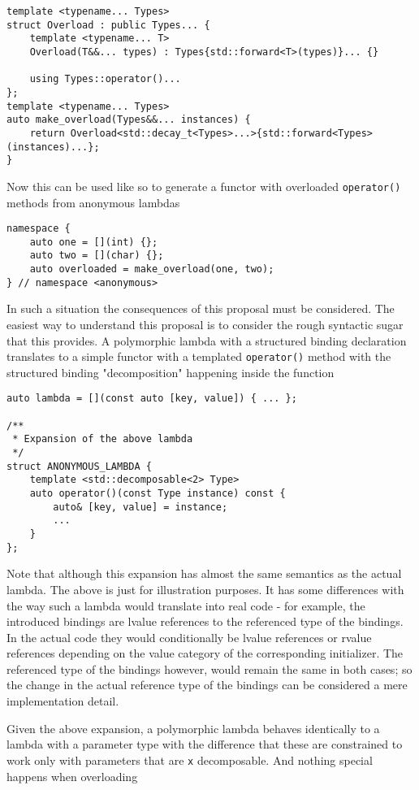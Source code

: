 \documentclass{article}
\begin{document}
\begin{lstlisting}
template <typename... Types>
struct Overload : public Types... {
    template <typename... T>
    Overload(T&&... types) : Types{std::forward<T>(types)}... {}

    using Types::operator()...
};
template <typename... Types>
auto make_overload(Types&&... instances) {
    return Overload<std::decay_t<Types>...>{std::forward<Types>(instances)...};
}
\end{lstlisting}

Now this can be used like so to generate a functor with overloaded
\texttt{operator()} methods from anonymous lambdas

\begin{lstlisting}
namespace {
    auto one = [](int) {};
    auto two = [](char) {};
    auto overloaded = make_overload(one, two);
} // namespace <anonymous>
\end{lstlisting}

In such a situation the consequences of this proposal must be considered.  The
easiest way to understand this proposal is to consider the rough syntactic
sugar that this provides.  A polymorphic lambda with a structured binding
declaration translates to a simple functor with a templated
\texttt{operator()} method with the structured binding "decomposition"
happening inside the function

\begin{lstlisting}
auto lambda = [](const auto [key, value]) { ... };

/**
 * Expansion of the above lambda
 */
struct ANONYMOUS_LAMBDA {
    template <std::decomposable<2> Type>
    auto operator()(const Type instance) const {
        auto& [key, value] = instance;
        ...
    }
};
\end{lstlisting}

Note that although this expansion has almost the same semantics as the actual
lambda.  The above is just for illustration purposes.  It has some
differences with the way such a lambda would translate into real code - for
example, the introduced bindings are lvalue references to the referenced type
of the bindings.  In the actual code they would conditionally be lvalue
references or rvalue references depending on the value category of the
corresponding initializer.  The referenced type of the bindings however, would
remain the same in both cases; so the change in the actual reference type of
the bindings can be considered a mere implementation detail.

Given the above expansion, a polymorphic lambda behaves identically to a
lambda with a  parameter type with the difference that these are
constrained to work only with parameters that are \texttt{x} decomposable.
And nothing special happens when overloading
\end{document}
